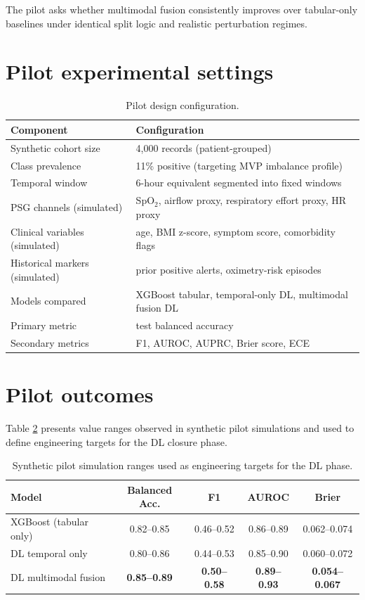 \documentclass[10pt,a4paper,twocolumn]{article}
\begin{document}
The pilot asks whether multimodal fusion consistently improves over tabular-only baselines under identical split logic and realistic perturbation regimes.

\section{Pilot experimental settings}
\begin{table}[t]
\centering
\small
\caption{Pilot design configuration.}
\label{tab:synth_setup}
\begin{tabular}{p{}p{}}
\toprule
Component & Configuration \\
\midrule
Synthetic cohort size & 4,000 records (patient-grouped) \\
Class prevalence & 11\% positive (targeting MVP imbalance profile) \\
Temporal window & 6-hour equivalent segmented into fixed windows \\
PSG channels (simulated) & SpO$_2$, airflow proxy, respiratory effort proxy, HR proxy \\
Clinical variables (simulated) & age, BMI z-score, symptom score, comorbidity flags \\
Historical markers (simulated) & prior positive alerts, oximetry-risk episodes \\
Models compared & XGBoost tabular, temporal-only DL, multimodal fusion DL \\
Primary metric & test balanced accuracy \\
Secondary metrics & F1, AUROC, AUPRC, Brier score, ECE \\
\bottomrule
\end{tabular}
\end{table}

\section{Pilot outcomes}
Table \ref{tab:synth_results} presents value ranges observed in synthetic pilot simulations and used to define engineering targets for the DL closure phase.

\begin{table}[t]
\centering
\small
\caption{Synthetic pilot simulation ranges used as engineering targets for the DL phase.}
\label{tab:synth_results}
\begin{tabular}{lcccc}
\toprule
Model & Balanced Acc. & F1 & AUROC & Brier \\
\midrule
XGBoost (tabular only) & 0.82--0.85 & 0.46--0.52 & 0.86--0.89 & 0.062--0.074 \\
DL temporal only & 0.80--0.86 & 0.44--0.53 & 0.85--0.90 & 0.060--0.072 \\
DL multimodal fusion & \textbf{0.85--0.89} & \textbf{0.50--0.58} & \textbf{0.89--0.93} & \textbf{0.054--0.067} \\
\bottomrule
\end{tabular}
\end{table}
\end{document}
